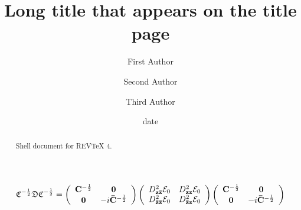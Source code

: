 \documentclass[aps,preprint]{revtex4}%
\begin{document}
\title[Short title for running header]{Long title that appears on the title page}
\author{First Author}
\author{Second Author}
\author{Third Author}

\begin{abstract}
Shell document for REV\TeX{} 4.

\end{abstract}
\date[Date text]{date}




\maketitle
\tableofcontents
%

\begin{equation}
\mathfrak{C}^{-\frac{1}{2}}\mathfrak{DC}^{-\frac{1}{2}}=\left(
\begin{array}
[c]{cc}%
\mathbf{C}^{-\frac{1}{2}} & \mathbf{0}\\
\mathbf{0} & -i\mathbf{\bar{C}}^{-\frac{1}{2}}%
\end{array}
\right)  \left(
\begin{array}
[c]{cc}%
D_{\mathbf{z\bar{z}}}^{2}\mathcal{E}_{0} & D_{\mathbf{zz}}^{2}\mathcal{E}%
_{0}\\
D_{\mathbf{\bar{z}\bar{z}}}^{2}\mathcal{E}_{0} & D_{\mathbf{\bar{z}z}}%
^{2}\mathcal{E}_{0}%
\end{array}
\right)  \left(
\begin{array}
[c]{cc}%
\mathbf{C}^{-\frac{1}{2}} & \mathbf{0}\\
\mathbf{0} & -i\mathbf{\bar{C}}^{-\frac{1}{2}}%
\end{array}
\right)
\end{equation}
%
\end{document}

